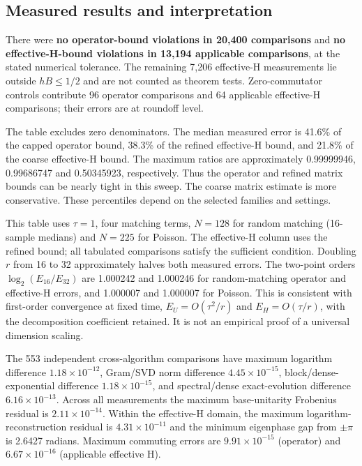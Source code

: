 \subsection{Measured results and interpretation}
There were \textbf{no operator-bound violations in 20,400 comparisons} and \textbf{no effective-H-bound violations in 13,194 applicable comparisons}, at the stated numerical tolerance. The remaining 7,206 effective-H measurements lie outside $hB\leq1/2$ and are not counted as theorem tests. Zero-commutator controls contribute 96 operator comparisons and 64 applicable effective-H comparisons; their errors are at roundoff level.

\begin{center}\small\end{center}
The table excludes zero denominators. The median measured error is 41.6\% of the capped operator bound, 38.3\% of the refined effective-H bound, and 21.8\% of the coarse effective-H bound. The maximum ratios are approximately 0.99999946, 0.99686747 and 0.50345923, respectively. Thus the operator and refined matrix bounds can be nearly tight in this sweep. The coarse matrix estimate is more conservative. These percentiles depend on the selected families and settings.

\begin{center}\small\end{center}
This table uses $\tau=1$, four matching terms, $N=128$ for random matching (16-sample medians) and $N=225$ for Poisson. The effective-H column uses the refined bound; all tabulated comparisons satisfy the sufficient condition. Doubling $r$ from 16 to 32 approximately halves both measured errors. The two-point orders $\log_2(E_{16}/E_{32})$ are 1.000242 and 1.000246 for random-matching operator and effective-H errors, and 1.000007 and 1.000007 for Poisson. This is consistent with first-order convergence at fixed time, $E_U=O(\tau^2/r)$ and $E_H=O(\tau/r)$, with the decomposition coefficient retained. It is not an empirical proof of a universal dimension scaling.

The 553 independent cross-algorithm comparisons have maximum logarithm difference $1.18\times10^{-12}$, Gram/SVD norm difference $4.45\times10^{-15}$, block/dense-exponential difference $1.18\times10^{-15}$, and spectral/dense exact-evolution difference $6.16\times10^{-13}$. Across all measurements the maximum base-unitarity Frobenius residual is $2.11\times10^{-14}$. Within the effective-H domain, the maximum logarithm-reconstruction residual is $4.31\times10^{-11}$ and the minimum eigenphase gap from $\pm\pi$ is 2.6427 radians. Maximum commuting errors are $9.91\times10^{-15}$ (operator) and $6.67\times10^{-16}$ (applicable effective H).

